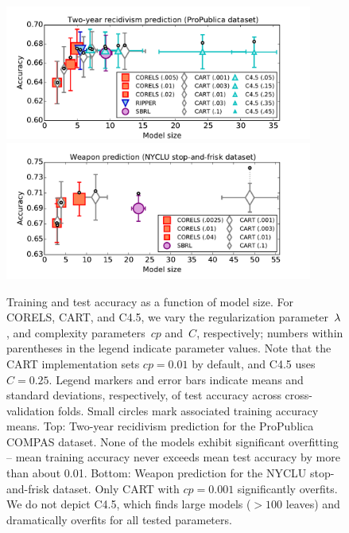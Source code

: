 \begin{figure}[t!]
\begin{center}
\includegraphics[trim={12mm, 0mm, 24mm, 5mm},
width=0.9\textwidth]{figs/compas-sparsity-training.pdf}
\includegraphics[trim={12mm, 0mm, 24mm, 1mm},
width=0.9\textwidth]{figs/frisk-sparsity-training.pdf}
\end{center}
\caption{Training and test accuracy as a function of model size.
%
For CORELS, CART, and C4.5, we vary the regularization parameter~${\lambda}$,
and complexity parameters~$cp$ and~$C$, respectively;
numbers within parentheses in the legend indicate parameter values.
%
Note that the CART implementation sets ${cp = 0.01}$ by default,
and C4.5 uses ${C = 0.25}$.
%
Legend markers and error bars indicate means and standard deviations,
respectively, of test accuracy across cross-validation folds.
%
Small circles mark associated training accuracy means.
%
Top:  Two-year recidivism prediction for the ProPublica COMPAS dataset.
%
None of the models exhibit significant overfitting --
mean training accuracy never exceeds mean test accuracy
by more than about 0.01.
%
Bottom:  Weapon prediction for the NYCLU stop-and-frisk dataset.
%
Only CART with ${cp = 0.001}$ significantly overfits.
%
We do not depict C4.5, which finds large models (${>100}$ leaves)
and dramatically overfits for all tested parameters.
}
\label{fig:sparsity}
\end{figure}

